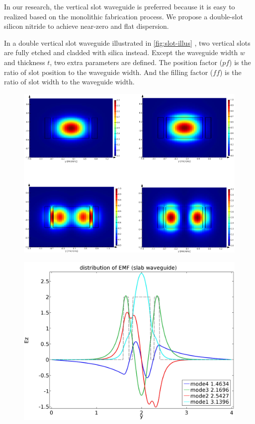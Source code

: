 In our research, the vertical slot waveguide is preferred because it is easy to realized based on the monolithic fabrication process. We propose a double-slot silicon nitride to achieve near-zero and flat dispersion.

In a double vertical slot waveguide illustrated in \autoref{fig:slot-illus} , two vertical slots are fully etched and cladded with silica instead. Except the waveguide width $w$ and thickness $t$, two extra parameters are defined. The position factor ($ \mathit{pf} $) is the ratio of slot position to the waveguide width. And the filling factor ($ \mathit{ff} $) is the ratio of slot width to the waveguide width.

\begin{figure}
		\centering	
		
		\label{fig:slot-illus}
\end{figure}

\begin{figure}
	\centering
	\includegraphics[width=0.7\linewidth]{imgs/png/slot-mode}
 	\label{fig:slot-mode}
\end{figure}

\begin{figure}
	\centering
	\includegraphics[width=0.7\linewidth]{imgs/png/Ez}
	\label{fig:slot-mode-Ez}
\end{figure}

